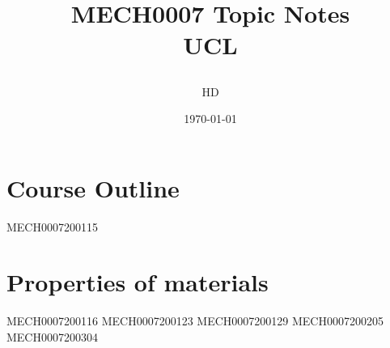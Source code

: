 \documentclass[12pt,a4paper, twoside]{report}
\begin{document}
\title{
  {MECH0007 Topic Notes}\\
  {\large UCL}
  \author{HD}
  \date{\today}
}
\maketitle
\tableofcontents
\chapter{Course Outline}
{MECH0007200115}
\chapter{Properties of materials}
{MECH0007200116}
{MECH0007200123}
{MECH0007200129}
{MECH0007200205}
{MECH0007200304}
\end{document}

